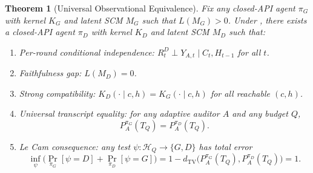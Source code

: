 \documentclass{article}
\theoremstyle{plain}
\newtheorem{theorem}{Theorem}
\theoremstyle{definition}
\theoremstyle{remark}
\newcommand{\TV}{\mathrm{TV}}
\newcommand{\dtv}{d_{\TV}}
\newcommand{\Hist}{\mathcal{H}}
\newcommand{\PpiA}[1]{P_A^{\pi_{#1}}}
\begin{document}
\begin{theorem}[Universal Observational Equivalence]\label{thm:transcript-indist}
Fix any closed-API agent $\pi_G$ with kernel $K_G$ and latent SCM $M_G$ such
that $L(M_G) > 0$. Under , there exists
a closed-API agent $\pi_D$ with kernel $K_D$ and latent SCM $M_D$ such that:
\begin{enumerate}
  \item[(i)] \emph{Per-round conditional independence:}
    $R_t^D \perp Y_{A,t} \mid C_t, H_{t-1}$ for all $t$.
  \item[(ii)] \emph{Faithfulness gap:} $L(M_D) = 0$.
  \item[(iii)] \emph{Strong compatibility:}
    $K_D(\cdot \mid c, h) = K_G(\cdot \mid c, h)$ for all reachable $(c, h)$.
  \item[(iv)] \emph{Universal transcript equality:} for any adaptive auditor
    $A$ and any budget $Q$,
    \[
    \PpiA{G}(T_Q) = \PpiA{D}(T_Q).
    \]
  \item[(v)] \emph{Le Cam consequence:} any test
    $\psi : \Hist_Q \to \{G, D\}$ has total error
    \[
    \inf_\psi \big( \Pr_{\pi_G}[\psi = D] + \Pr_{\pi_D}[\psi = G] \big)
    = 1 - \dtv\big(\PpiA{G}(T_Q), \PpiA{D}(T_Q)\big) = 1.
    \]
\end{enumerate}
\end{theorem}
\end{document}
